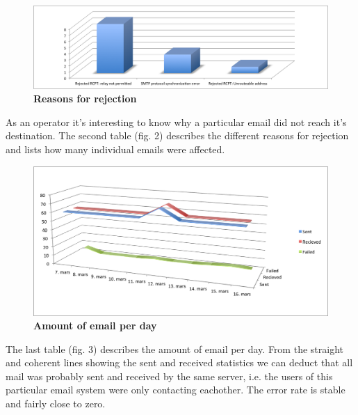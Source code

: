 \begin{figure}[htb]
  \begin{center}
    \includegraphics[scale=0.55]{img/rejection-reasons.png}
  \end{center}
  \caption{\bf{Reasons for rejection}}
\end{figure}

As an operator it's interesting to know why a particular email did not reach it's destination. The second table (fig. 2) describes the different reasons for rejection and lists how many individual emails were affected.\newline

\begin{figure}[h!]
  \begin{center}
    \includegraphics[scale=0.70]{img/sent-received-failed.png}
  \end{center}
  \caption{\bf{Amount of email per day}}
\end{figure}

The last table (fig. 3) describes the amount of email per day. From the straight and coherent lines showing the sent and received statistics we can deduct that all mail was probably sent and received by the same server, i.e. the users of this particular email system were only contacting eachother. The error rate is stable and fairly close to zero.\newline